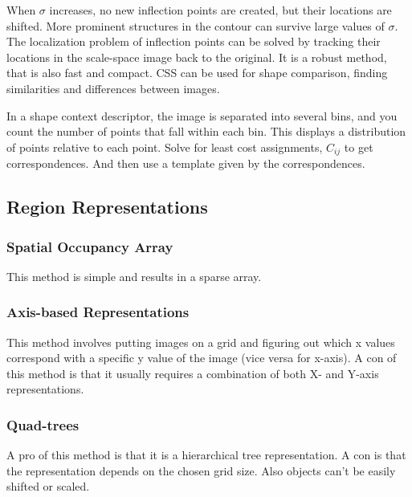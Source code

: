 \documentclass{article}
\begin{document}
\begin{multicols}{2}
  \vspace{5mm}
  
  When $\sigma$ increases, no new inflection points are created, but their locations are shifted.
  More prominent structures in the contour can survive large values of $\sigma$.
  The localization problem of inflection points can be solved by tracking their locations in the scale-space image back to the original.
  It is a robust method, that is also fast and compact.
  CSS can be used for shape comparison, finding similarities and differences between images.

  \vspace{5mm}

  In a shape context descriptor, the image is separated into several bins, and you count the number of points that fall within each bin. This displays a distribution of points relative to each point.
  Solve for least cost assignments, $C_{ij}$ to get correspondences. And then use a template given by the correspondences.

 \subsection{Region Representations}
 \subsubsection{Spatial Occupancy Array}

  This method is simple and results in a sparse array.

 \subsubsection{Axis-based Representations}

  This method involves putting images on a grid and figuring out which x values correspond with a specific y value of the image (vice versa for x-axis).
  A con of this method is that it usually requires a combination of both X- and Y-axis representations.

 \subsubsection{Quad-trees}

  A pro of this method is that it is a hierarchical tree representation. A con is that the representation depends on the chosen grid size. Also objects can't be easily shifted or scaled.
  

\end{multicols}
\end{document}

